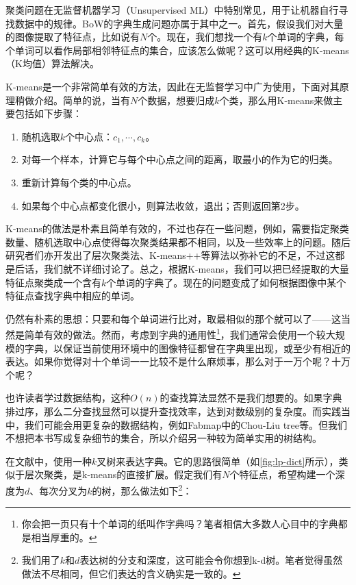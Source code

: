 聚类问题在无监督机器学习（Unsupervised ML）中特别常见，用于让机器自行寻找数据中的规律。BoW的字典生成问题亦属于其中之一。首先，假设我们对大量的图像提取了特征点，比如说有$N$个。现在，我们想找一个有$k$个单词的字典，每个单词可以看作局部相邻特征点的集合，应该怎么做呢？这可以用经典的K-means（K均值）算法\textsuperscript{\cite{Lloyd1982}}解决。

K-means是一个非常简单有效的方法，因此在无监督学习中广为使用，下面对其原理稍做介绍。简单的说，当有$N$个数据，想要归成$k$个类，那么用K-means来做主要包括如下步骤：
\begin{mdframed}
\begin{enumerate}
	\item 随机选取$k$个中心点：$c_1, \cdots, c_k$。
	\item 对每一个样本，计算它与每个中心点之间的距离，取最小的作为它的归类。
	\item 重新计算每个类的中心点。
	\item 如果每个中心点都变化很小，则算法收敛，退出；否则返回第2步。
\end{enumerate}
\end{mdframed}

K-means的做法是朴素且简单有效的，不过也存在一些问题，例如，需要指定聚类数量、随机选取中心点使得每次聚类结果都不相同，以及一些效率上的问题。随后研究者们亦开发出了层次聚类法、K-means++\textsuperscript{\cite{Arthur2007}}等算法以弥补它的不足，不过这都是后话，我们就不详细讨论了。总之，根据K-means，我们可以把已经提取的大量特征点聚类成一个含有$k$个单词的字典了。现在的问题变成了如何根据图像中某个特征点查找字典中相应的单词。

仍然有朴素的思想：只要和每个单词进行比对，取最相似的那个就可以了——这当然是简单有效的做法。然而，考虑到字典的通用性\footnote{你会把一页只有十个单词的纸叫作字典吗？笔者相信大多数人心目中的字典都是相当厚重的。}，我们通常会使用一个较大规模的字典，以保证当前使用环境中的图像特征都曾在字典里出现，或至少有相近的表达。如果你觉得对十个单词一一比较不是什么麻烦事，那么对于一万个呢？十万个呢？

也许读者学过数据结构，这种$O(n)$的查找算法显然不是我们想要的。如果字典排过序，那么二分查找显然可以提升查找效率，达到对数级别的复杂度。而实践当中，我们可能会用更复杂的数据结构，例如Fabmap\textsuperscript{\cite{Cummins2008, Cummins2010, Cummins2011}}中的Chou-Liu tree\textsuperscript{\cite{Chow1968}}等。但我们不想把本书写成复杂细节的集合，所以介绍另一种较为简单实用的树结构\textsuperscript{\cite{Galvez-Lopez2012}}。

在文献\cite{Galvez-Lopez2012}中，使用一种$k$叉树来表达字典。它的思路很简单（如\autoref{fig:lp-dict}所示），类似于层次聚类，是k-means的直接扩展。假定我们有$N$个特征点，希望构建一个深度为$d$、每次分叉为$k$的树，那么做法如下\footnote{我们用了$k$和$d$表达树的分支和深度，这可能会令你想到k-d树\textsuperscript{\cite{Bentley1975}}。笔者觉得虽然做法不尽相同，但它们表达的含义确实是一致的。}：

